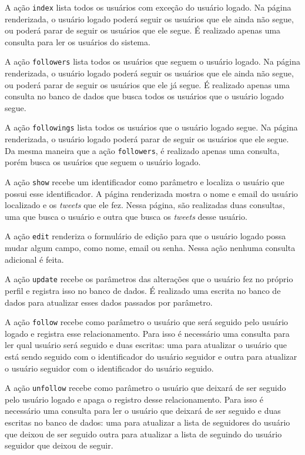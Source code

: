 A ação \verb|index| lista todos os usuários com exceção do usuário logado. Na página renderizada, o usuário logado poderá seguir os usuários que ele ainda não segue, ou poderá parar de seguir os usuários que ele segue. É realizado apenas uma consulta para ler os usuários do sistema.

A ação \verb|followers| lista todos os usuários que seguem o usuário logado. Na página renderizada, o usuário logado poderá seguir os usuários que ele ainda não segue, ou poderá parar de seguir os usuários que ele já segue. É realizado apenas uma consulta no banco de dados que busca todos os usuários que o usuário logado segue.

A ação \verb|followings| lista todos os usuários que o usuário logado segue. Na página renderizada, o usuário logado poderá parar de seguir os usuários que ele segue. Da mesma maneira que a ação \verb|followers|, é realizado apenas uma consulta, porém busca os usuários que seguem o usuário logado.

A ação \verb|show| recebe um identificador como parâmetro e localiza o usuário que possui esse identificador. A página renderizada mostra o nome e email do usuário localizado e os \textit{tweets} que ele fez. Nessa página, são realizadas duas consultas, uma que busca o usuário e outra que busca os \textit{tweets} desse usuário.

A ação \verb|edit| renderiza o formulário de edição para que o usuário logado possa mudar algum campo, como nome, email ou senha. Nessa ação nenhuma consulta adicional é feita.

A ação \verb|update| recebe os parâmetros das alterações que o usuário fez no próprio perfil e registra isso no banco de dados. É realizado uma escrita no banco de dados para atualizar esses dados passados por parâmetro.

A ação \verb|follow| recebe como parâmetro o usuário que será seguido pelo usuário logado e registra esse relacionamento. Para isso é necessário uma consulta para ler qual usuário será seguido e duas escritas: uma para atualizar o usuário que está sendo seguido com o identificador do usuário seguidor e outra para atualizar o usuário seguidor com o identificador do usuário seguido.

A ação \verb|unfollow| recebe como parâmetro o usuário que deixará de ser seguido pelo usuário logado e apaga o registro desse relacionamento. Para isso é necessário uma consulta para ler o usuário que deixará de ser seguido e duas escritas no banco de dados: uma para atualizar a lista de seguidores do usuário que deixou de ser seguido outra para atualizar a lista de seguindo do usuário seguidor que deixou de seguir.


